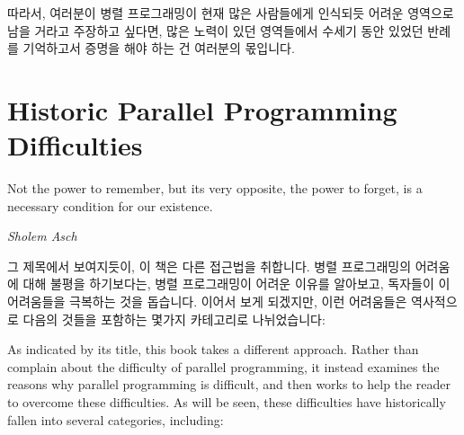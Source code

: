 따라서, 여러분이 병렬 프로그래밍이 현재 많은 사람들에게 인식되듯 어려운
영역으로 남을 거라고 주장하고 싶다면, 많은 노력이 있던 영역들에서 수세기 동안
있었던 반례를 기억하고서 증명을 해야 하는 건 여러분의 몫입니다.

\section{Historic Parallel Programming Difficulties}
\label{sec:intro:Historic Parallel Programming Difficulties}
%
\epigraph{Not the power to remember, but its very opposite, the power to
	  forget, is a necessary condition for our existence.}
	 {\emph{Sholem Asch}}

그 제목에서 보여지듯이, 이 책은 다른 접근법을 취합니다.
병렬 프로그래밍의 어려움에 대해 불평을 하기보다는, 병렬 프로그래밍이 어려운
이유를 알아보고, 독자들이 이 어려움들을 극복하는 것을 돕습니다.
이어서 보게 되겠지만, 이런 어려움들은 역사적으로 다음의 것들을 포함하는 몇가지
카테고리로 나뉘었습니다:

\iffalse

As indicated by its title, this book takes a different approach.
Rather than complain about the difficulty of parallel programming,
it instead examines the reasons why parallel programming is
difficult, and then works to help the reader to overcome these
difficulties.
As will be seen, these difficulties have historically fallen into several
categories, including:


